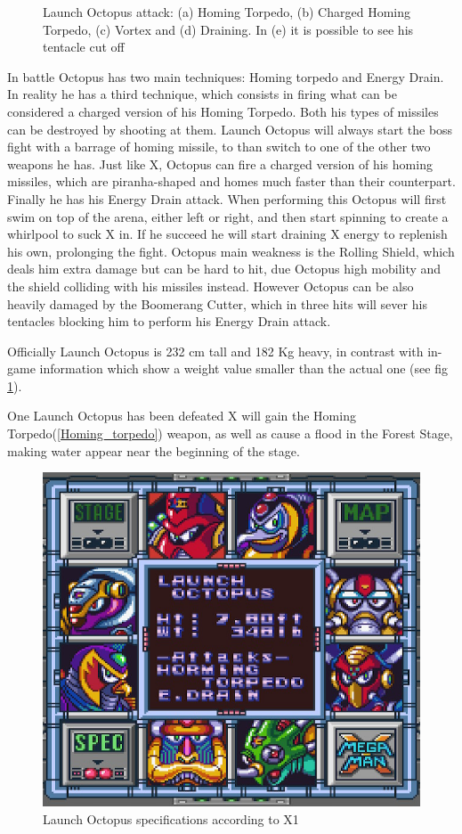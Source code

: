 \begin{figure}[h]
	\caption{Launch Octopus attack: (a) Homing Torpedo, (b) Charged Homing Torpedo, (c) Vortex and (d) Draining. In (e) it is possible to see his tentacle cut off}
\end{figure}

In battle Octopus has two main techniques: Homing torpedo and Energy Drain. In reality he has a third technique, which consists in firing what can be considered a charged version of his Homing Torpedo. Both his types of missiles can be destroyed by shooting at them. Launch Octopus will always start the boss fight with a barrage of homing missile, to than switch to one of the other two weapons he has. Just like X, Octopus can fire a charged version of his homing missiles, which are piranha-shaped and homes much faster than their counterpart. Finally he has his Energy Drain attack. When performing this Octopus will first swim on top of the arena, either left or right, and then start spinning to create a whirlpool to suck X in. If he succeed he will start draining X energy to replenish his own, prolonging the fight. Octopus main weakness is the Rolling Shield, which deals him extra damage but can be hard to hit, due Octopus high mobility and the shield colliding with his missiles instead. However Octopus can be also heavily damaged by the Boomerang Cutter, which in three hits will sever his tentacles blocking him to perform his Energy Drain attack. 

Officially\cite{wayback:X_resources} Launch Octopus is 232 cm tall and 182 Kg heavy, in contrast with in-game information\cite{wiki:Launch_Octopus} which show a weight value smaller than the actual one (see fig \ref{Octopus_specs}).

One Launch Octopus has been defeated X will gain the Homing Torpedo(\ref{Homing_torpedo}) weapon, as well as cause a flood in the Forest Stage, making water appear near the beginning of the stage.
\begin{figure}[htp]
	\centering
	\includegraphics[width=0.6\linewidth]{figures/X1/Launch_octopus_specs.png}
	\caption{Launch Octopus specifications according to X1}
	\label{Octopus_specs}
\end{figure}

